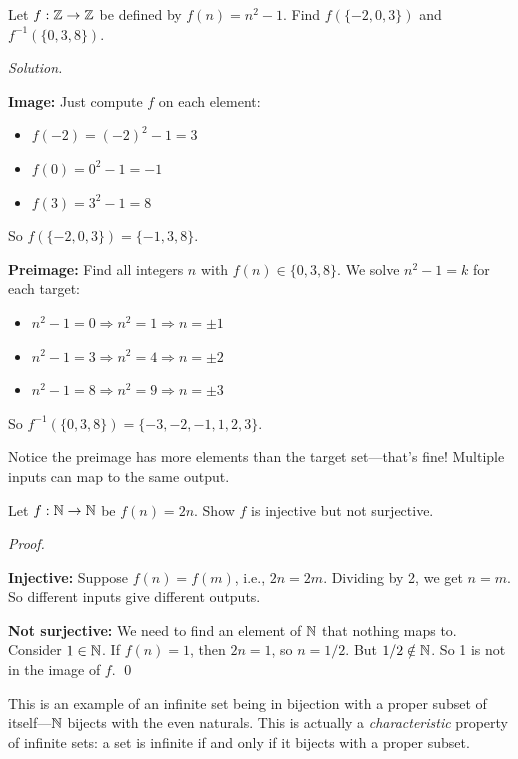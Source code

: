 \begin{example}
Let $f: \mathbb{Z} \to \mathbb{Z}$ be defined by $f(n) = n^2 - 1$. Find $f(\{-2, 0, 3\})$ and $f^{-1}(\{0, 3, 8\})$.

\emph{Solution.}

\textbf{Image:} Just compute $f$ on each element:
\begin{itemize}
  \item $f(-2) = (-2)^2 - 1 = 3$
  \item $f(0) = 0^2 - 1 = -1$
  \item $f(3) = 3^2 - 1 = 8$
\end{itemize}
So $f(\{-2, 0, 3\}) = \{-1, 3, 8\}$.

\textbf{Preimage:} Find all integers $n$ with $f(n) \in \{0, 3, 8\}$. We solve $n^2 - 1 = k$ for each target:
\begin{itemize}
  \item $n^2 - 1 = 0 \Rightarrow n^2 = 1 \Rightarrow n = \pm 1$
  \item $n^2 - 1 = 3 \Rightarrow n^2 = 4 \Rightarrow n = \pm 2$
  \item $n^2 - 1 = 8 \Rightarrow n^2 = 9 \Rightarrow n = \pm 3$
\end{itemize}
So $f^{-1}(\{0, 3, 8\}) = \{-3, -2, -1, 1, 2, 3\}$.

Notice the preimage has more elements than the target set---that's fine! Multiple inputs can map to the same output.
\end{example}

\begin{example}
Let $f:\mathbb{N}\to\mathbb{N}$ be $f(n)=2n$. Show $f$ is injective but not surjective.

\emph{Proof.}

\textbf{Injective:} Suppose $f(n) = f(m)$, i.e., $2n = 2m$. Dividing by 2, we get $n = m$. So different inputs give different outputs.

\textbf{Not surjective:} We need to find an element of $\mathbb{N}$ that nothing maps to. Consider $1 \in \mathbb{N}$. If $f(n) = 1$, then $2n = 1$, so $n = 1/2$. But $1/2 \notin \mathbb{N}$. So 1 is not in the image of $f$. \qed

This is an example of an infinite set being in bijection with a proper subset of itself---$\mathbb{N}$ bijects with the even naturals. This is actually a \emph{characteristic} property of infinite sets: a set is infinite if and only if it bijects with a proper subset.
\end{example}

